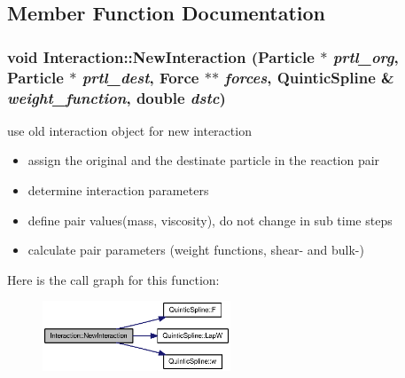 \subsection{Member Function Documentation}
\hypertarget{classInteraction_cba2f76f1316695e948c07d31dfadea9}{
\subsubsection[{NewInteraction}]{\setlength{\rightskip}{0pt plus 5cm}void Interaction::NewInteraction ({\bf Particle} $\ast$ {\em prtl\_\-org}, \/  {\bf Particle} $\ast$ {\em prtl\_\-dest}, \/  {\bf Force} $\ast$$\ast$ {\em forces}, \/  {\bf QuinticSpline} \& {\em weight\_\-function}, \/  double {\em dstc})}}
\label{classInteraction_cba2f76f1316695e948c07d31dfadea9}


use old interaction object for new interaction 



\begin{itemize}
\item assign the original and the destinate particle in the reaction pair\end{itemize}


\begin{itemize}
\item determine interaction parameters\end{itemize}


\begin{itemize}
\item define pair values(mass, viscosity), do not change in sub time steps\end{itemize}


\begin{itemize}
\item calculate pair parameters (weight functions, shear- and bulk-) \end{itemize}


Here is the call graph for this function:\nopagebreak
\begin{figure}[H]
\begin{center}
\leavevmode
\includegraphics[width=159pt]{classInteraction_cba2f76f1316695e948c07d31dfadea9_cgraph}
\end{center}
\end{figure}


